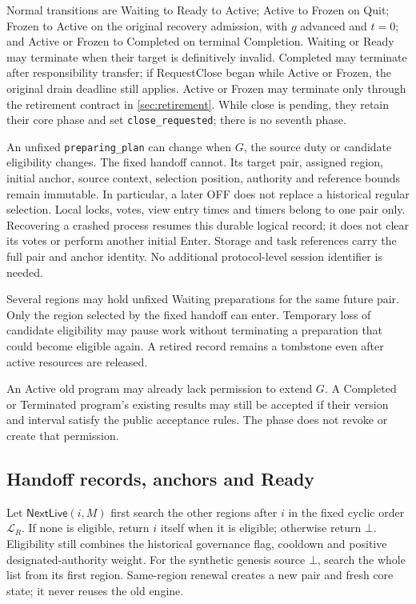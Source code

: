 \documentclass[11pt,a4paper]{article}
\newcommand{\tagg}[1]{\ensuremath{\mathsf{#1}}}
\newcounter{protocol}
\begin{document}
Normal transitions are Waiting to Ready to Active; Active to Frozen
on Quit; Frozen to Active on the original recovery admission, with
$g$ advanced and $t=0$; and Active or Frozen to Completed on terminal
Completion. Waiting or Ready may terminate when their target is
definitively invalid. Completed may terminate after responsibility
transfer; if RequestClose began while Active or Frozen, the original
drain deadline still applies. Active or Frozen may terminate only through the retirement
contract in \cref{sec:retirement}. While close is pending, they retain
their core phase and set \texttt{close\_requested}; there is no seventh
phase.

An unfixed \texttt{preparing\_plan} can change when $G$, the source
duty or candidate eligibility changes. The fixed handoff cannot.
Its target pair, assigned region, initial anchor, source context,
selection position, authority and reference bounds remain immutable.
In particular, a later OFF does not replace a historical regular
selection. Local locks, votes, view entry times and timers belong to
one pair only. Recovering a crashed process resumes this durable
logical record; it does not clear its votes or perform another initial
Enter. Storage and task references carry the full pair and anchor
identity. No additional protocol-level session identifier is needed.

Several regions may hold unfixed Waiting preparations for the same
future pair. Only the region selected by the fixed handoff can enter.
Temporary loss of candidate eligibility may pause work without
terminating a preparation that could become eligible again. A retired
record remains a tombstone even after active resources are released.

An Active old program may already lack permission to extend $G$.
A Completed or Terminated program's existing results may still be
accepted if their version and interval satisfy the public acceptance
rules. The phase does not revoke or create that permission.

\subsection{Handoff records, anchors and Ready}
\label{sec:witness}
Let $\tagg{NextLive}(i,M)$ first search the other regions after $i$
in the fixed cyclic order $\mathcal L_R$. If none is eligible, return
$i$ itself when it is eligible; otherwise return $\bot$. Eligibility
still combines the historical governance flag, cooldown and positive
designated-authority weight. For the synthetic genesis source $\bot$,
search the whole list from its first region. Same-region renewal creates
a new pair and fresh core state; it never reuses the old engine.
\end{document}

